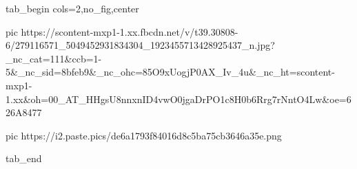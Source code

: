  
 
 
 
 

\ifcmt
  tab_begin cols=2,no_fig,center

     pic https://scontent-mxp1-1.xx.fbcdn.net/v/t39.30808-6/279116571_5049452931834304_1923455713428925437_n.jpg?_nc_cat=111&ccb=1-5&_nc_sid=8bfeb9&_nc_ohc=85O9xUogjP0AX_Iv_4u&_nc_ht=scontent-mxp1-1.xx&oh=00_AT_HHgsU8nnxnID4vwO0jgaDrPO1c8H0b6Rrg7rNntO4Lw&oe=626A8477

		 pic https://i2.paste.pics/de6a1793f84016d8c5ba75cb3646a35e.png

  tab_end
\fi
